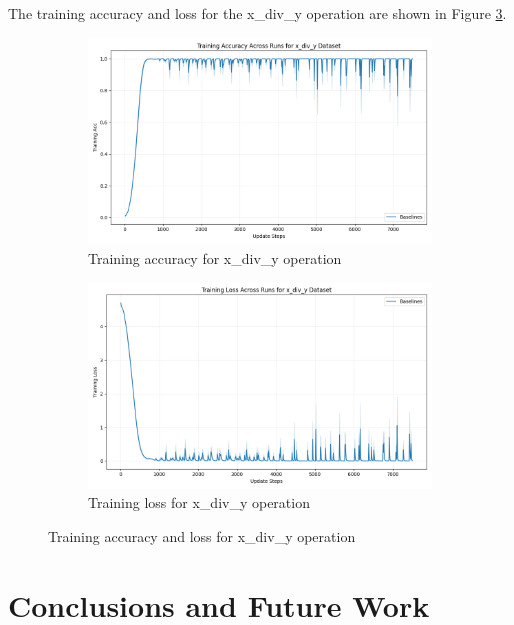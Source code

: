 \documentclass{article} %
\begin{document}
The training accuracy and loss for the x\_div\_y operation are shown in Figure \ref{fig:training_metrics}.

\begin{figure}[h]
    \centering
    \begin{subfigure}{0.49\textwidth}
        \includegraphics[width=\textwidth]{train_acc_x_div_y.png}
        \caption{Training accuracy for x\_div\_y operation}
        \label{fig:train_acc_x_div_y}
    \end{subfigure}
    \hfill
    \begin{subfigure}{0.49\textwidth}
        \includegraphics[width=\textwidth]{train_loss_x_div_y.png}
        \caption{Training loss for x\_div\_y operation}
        \label{fig:train_loss_x_div_y}
    \end{subfigure}
    \caption{Training accuracy and loss for x\_div\_y operation}
    \label{fig:training_metrics}
\end{figure}

\section{Conclusions and Future Work}
\label{sec:conclusion}
\end{document}
